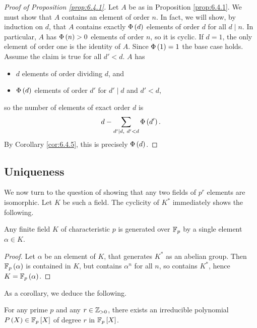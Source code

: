 \begin{proof}[Proof of Proposition \ref{prop:6.4.1}]
Let $ A $ be as in Proposition \ref{prop:6.4.1}. We must show that $ A $ contains an element of order $ n $. In fact, we will show, by induction on $ d $, that $ A $ contains exactly $ \Phi\left( d \right) $ elements of order $ d $ for all $ d \mid n $. In particular, $ A $ has $ \Phi\left( n \right) > 0 $ elements of order $ n $, so it is cyclic. If $ d = 1 $, the only element of order one is the identity of $ A $. Since $ \Phi\left( 1 \right) = 1 $ the base case holds. Assume the claim is true for all $ d' < d $. $ A $ has
\begin{itemize}
\item $ d $ elements of order dividing $ d $, and
\item $ \Phi\left( d \right) $ elements of order $ d' $ for $ d' \mid d $ and $ d' < d $,
\end{itemize}
so the number of elements of exact order $ d $ is
$$ d - \sum_{d' \mid d, \ d' < d} \Phi\left( d' \right). $$
By Corollary \ref{cor:6.4.5}, this is precisely $ \Phi\left( d \right) $.
\end{proof}

\subsection{Uniqueness}

We now turn to the question of showing that any two fields of $ p^r $ elements are isomorphic. Let $ K $ be such a field. The cyclicity of $ K^* $ immediately shows the following.

\begin{proposition}
Any finite field $ K $ of characteristic $ p $ is generated over $ \mathbb{F}_p $ by a single element $ \alpha \in K $.
\end{proposition}

\begin{proof}
Let $ \alpha $ be an element of $ K $, that generates $ K^* $ as an abelian group. Then $ \mathbb{F}_p\left( \alpha \right) $ is contained in $ K $, but contains $ \alpha^n $ for all $ n $, so contains $ K^* $, hence $ K = \mathbb{F}_p\left( \alpha \right) $.
\end{proof}

As a corollary, we deduce the following.

\begin{proposition}
For any prime $ p $ and any $ r \in \mathbb{Z}_{> 0} $, there exists an irreducible polynomial $ P\left( X \right) \in \mathbb{F}_p\left[ X \right] $ of degree $ r $ in $ \mathbb{F}_p\left[ X \right] $.
\end{proposition}

